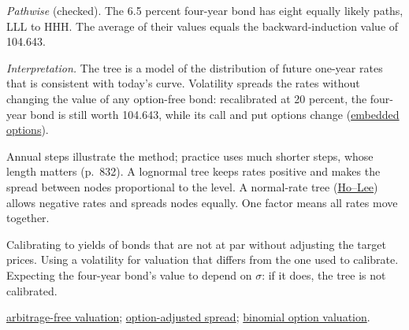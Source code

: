 \begin{qfmethod}
\emph{Pathwise} (checked). The 6.5 percent four-year bond has eight equally likely paths, LLL to HHH. The average of their values equals the backward-induction value of 104.643.

\emph{Interpretation.} The tree is a model of the distribution of future one-year rates that is consistent with today's curve. Volatility spreads the rates without changing the value of any option-free bond: recalibrated at 20 percent, the four-year bond is still worth 104.643, while its call and put options change (\hyperref[meth:callable-putable-bond-valuation]{embedded options}).

 Annual steps illustrate the method; practice uses much shorter steps, whose length matters (p.~832). A lognormal tree keeps rates positive and makes the spread between nodes proportional to the level. A normal-rate tree (\hyperref[mod:term-structure-models-simulation]{Ho--Lee}) allows negative rates and spreads nodes equally. One factor means all rates move together.

 Calibrating to yields of bonds that are not at par without adjusting the target prices. Using a volatility for valuation that differs from the one used to calibrate. Expecting the four-year bond's value to depend on $\sigma$: if it does, the tree is not calibrated.

 \hyperref[meth:arbitrage-free-bond-valuation]{arbitrage-free valuation}; \hyperref[meth:option-adjusted-spread]{option-adjusted spread}; \hyperref[meth:multi-period-binomial-valuation]{binomial option valuation}.

\end{qfmethod}

